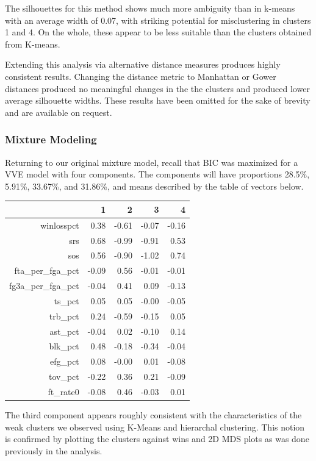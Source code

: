 \documentclass[10pt,a4paper, hidelinks]{article} %
\begin{document}
The silhouettes for this method shows much more ambiguity than in k-means with an average width of 0.07, with striking potential for misclustering in clusters 1 and 4.  On the whole, these appear to be less suitable than the clusters obtained from K-means.

Extending this analysis via alternative distance measures produces highly consistent results.  Changing the distance metric to Manhattan or Gower distances produced no meaningful changes in the the clusters and produced lower average silhouette widths.  These results have been omitted for the sake of brevity and are available on request.

\subsubsection{Mixture Modeling}

Returning to our original mixture model, recall that BIC was maximized for a VVE model with four components.  The components will have proportions 28.5\%, 5.91\%, 33.67\%, and 31.86\%, and means described by the table of vectors below.

\begin{table}[ht]
	\centering
	\begin{tabular}{rrrrr}
		\hline
		& 1 & 2 & 3 & 4 \\ 
		\hline
		winlosspct & 0.38 & -0.61 & -0.07 & -0.16 \\ 
		srs & 0.68 & -0.99 & -0.91 & 0.53 \\ 
		sos & 0.56 & -0.90 & -1.02 & 0.74 \\ 
		fta\_per\_fga\_pct & -0.09 & 0.56 & -0.01 & -0.01 \\ 
		fg3a\_per\_fga\_pct & -0.04 & 0.41 & 0.09 & -0.13 \\ 
		ts\_pct & 0.05 & 0.05 & -0.00 & -0.05 \\ 
		trb\_pct & 0.24 & -0.59 & -0.15 & 0.05 \\ 
		ast\_pct & -0.04 & 0.02 & -0.10 & 0.14 \\ 
		blk\_pct & 0.48 & -0.18 & -0.34 & -0.04 \\ 
		efg\_pct & 0.08 & -0.00 & 0.01 & -0.08 \\ 
		tov\_pct & -0.22 & 0.36 & 0.21 & -0.09 \\ 
		ft\_rate0 & -0.08 & 0.46 & -0.03 & 0.01 \\ 
		\hline
	\end{tabular}
\end{table}

The third component appears roughly consistent with the characteristics of the weak clusters we observed using K-Means and hierarchal clustering.  This notion is confirmed by plotting the clusters against wins and 2D MDS plots as was done previously in the analysis.  
\end{document}
